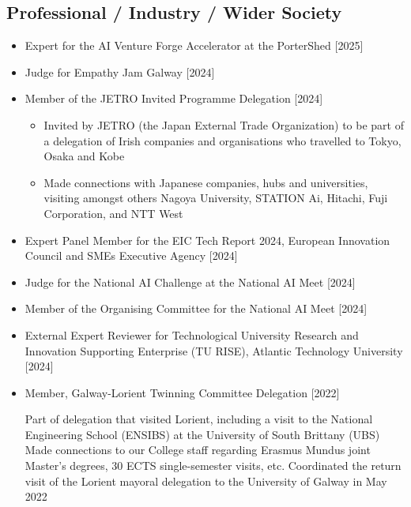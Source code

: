 \documentclass[10pt,a4paper]{res} %
\begin{document}
\begin{resume}
\subsection*{Professional / Industry / Wider Society}

\begin{itemize} \itemsep -2pt
\item Expert for the AI Venture Forge Accelerator at the PorterShed [2025]
\item Judge for Empathy Jam Galway [2024]
\item Member of the JETRO Invited Programme Delegation [2024]
\begin{itemize} \itemsep -2pt
\item Invited by JETRO (the Japan External Trade Organization) to be part of a delegation of Irish companies and organisations who travelled to Tokyo, Osaka and Kobe
\item Made connections with Japanese companies, hubs and universities, visiting amongst others Nagoya University, STATION Ai, Hitachi, Fuji Corporation, and NTT West
\end{itemize}
\item Expert Panel Member for the EIC Tech Report 2024, European Innovation Council and SMEs Executive Agency [2024]
\item Judge for the National AI Challenge at the National AI Meet [2024]
\item Member of the Organising Committee for the National AI Meet [2024]
\item External Expert Reviewer for Technological University Research and Innovation Supporting Enterprise (TU RISE), Atlantic Technology University [2024]
\item Member, Galway-Lorient Twinning Committee Delegation [2022]

Part of delegation that visited Lorient, including a visit to the National Engineering School (ENSIBS) at the University of South Brittany (UBS)
Made connections to our College staff regarding Erasmus Mundus joint Master’s degrees, 30 ECTS single-semester visits, etc.
Coordinated the return visit of the Lorient mayoral delegation to the University of Galway in May 2022


\end{itemize}
\end{resume}
\end{document}
